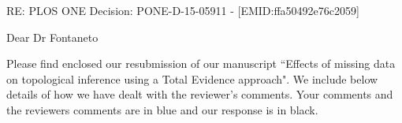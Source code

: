 \documentclass[11pt]{letter}
\begin{document}
\begin{letter}{}

RE: PLOS ONE Decision: PONE-D-15-05911 - [EMID:ffa50492e76c2059]

Dear Dr Fontaneto

Please find enclosed our resubmission of our manuscript ``Effects of missing data on topological inference using a Total Evidence approach". We include below details of how we have dealt with the reviewer's comments. Your comments and the reviewers comments are in blue and our response is in black.





\end{letter}
\end{document}
